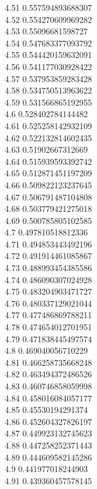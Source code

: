 {4.51	0.557594893688307\\
4.52	0.554270609969282\\
4.53	0.55096681598727\\
4.54	0.547683377093792\\
4.55	0.544420159632091\\
4.56	0.541177030928422\\
4.57	0.537953859283428\\
4.58	0.534750513963622\\
4.59	0.531566865192955\\
4.6	0.528402784144482\\
4.61	0.525258142932109\\
4.62	0.522132814602435\\
4.63	0.51902667312669\\
4.64	0.515939593392742\\
4.65	0.512871451197209\\
4.66	0.509822123237645\\
4.67	0.506791487104808\\
4.68	0.503779421275018\\
4.69	0.500785805102585\\
4.7	0.497810518812336\\
4.71	0.494853443492196\\
4.72	0.491914461085867\\
4.73	0.488993454385586\\
4.74	0.486090307024928\\
4.75	0.483204903471727\\
4.76	0.480337129021044\\
4.77	0.477486869788211\\
4.78	0.474654012701951\\
4.79	0.471838445497574\\
4.8	0.469040056710229\\
4.81	0.466258735668248\\
4.82	0.463494372486526\\
4.83	0.460746858059998\\
4.84	0.458016084057177\\
4.85	0.45530194291374\\
4.86	0.452604327826197\\
4.87	0.449923132745623\\
4.88	0.447258252371443\\
4.89	0.444609582145286\\
4.9	0.441977018244903\\
4.91	0.439360457578145\\
}
